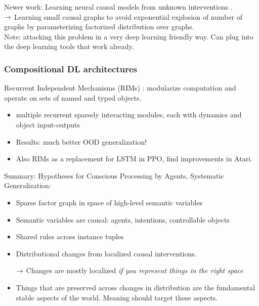 Newer work: Learning neural causal models from unknown interventions \cite{ke2019learning}. \\

$\rightarrow$ Learning small causal graphs to avoid exponential explosion of number of graphs by parameterizing factorized distribution over graphs. \\

Note: attacking this problem in a very deep learning friendly way. Can plug into the deep learning tools that work already.



\spacerule
\subsubsection{Compositional DL architectures}



Recurrent Independent Mechanisms (RIMs) \cite{goyal2019recurrent}: modularize computation and operate on sets of named and typed objects.
\begin{itemize}
    \item multiple recurrent sparsely interacting modules, each with dynamics and object input-outputs
    \item Results: much better OOD generalization!
    \item Also RIMs as a replacement for LSTM in PPO, find improvements in Atari.
\end{itemize}



Summary: Hypotheses for Conscious Processing by Agents, Systematic Generalization:
\begin{itemize}
    \item Sparse factor graph in space of high-level semantic variables
    \item Semantic variables are causal: agents, intentions, controllable objects
    \item Shared rules across instance tuples
    \item Distributional changes from localized causal interventions.
    
    $\rightarrow$ Changes are mostly localized {\it if you represent things in the right space}
    
    \item Things that are preserved across changes in distribution are the fundamental stable aspects of the world. Meaning should target these aspects.
\end{itemize}

